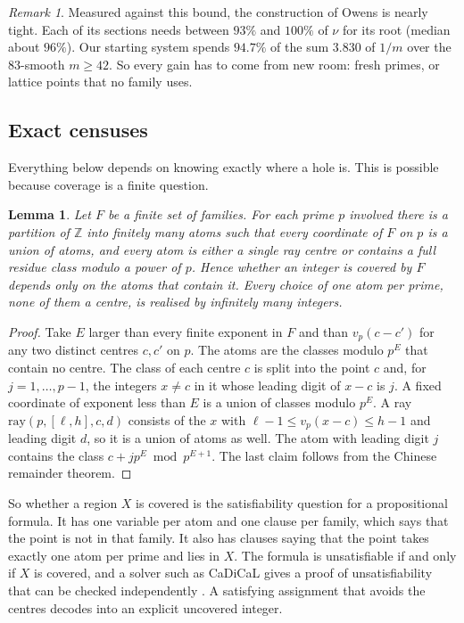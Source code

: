 \documentclass[11pt]{amsart}
\newtheorem{lemma}[theorem]{Lemma}
\theoremstyle{definition}
\theoremstyle{remark}
\newtheorem{remark}[theorem]{Remark}
\newcommand{\Z}{\mathbb{Z}}
\newcommand{\ray}{\mathrm{ray}}
\begin{document}
\begin{remark}\label{rem:tight}
Measured against this bound, the construction of Owens is nearly tight. Each of its sections needs between $93\%$
and $100\%$ of $\nu$ for its root (median about $96\%$). Our starting system spends $94.7\%$ of the sum $3.830$ of
$1/m$ over the $83$-smooth $m\ge42$. So every gain has to come from new room: fresh primes, or lattice points that no
family uses.
\end{remark}

\subsection{Exact censuses}\label{sec:census}

Everything below depends on knowing exactly where a hole is. This is possible because coverage is a finite question.

\begin{lemma}\label{lem:atoms}
Let $F$ be a finite set of families. For each prime $p$ involved there is a partition of $\Z$ into finitely many
\emph{atoms} such that every coordinate of $F$ on $p$ is a union of atoms, and every atom is either a single ray
centre or contains a full residue class modulo a power of $p$. Hence whether an integer is covered by $F$ depends
only on the atoms that contain it. Every choice of one atom per prime, none of them a centre, is realised by
infinitely many integers.
\end{lemma}

\begin{proof}
Take $E$ larger than every finite exponent in $F$ and than $v_p(c-c')$ for any two distinct centres $c,c'$ on $p$.
The atoms are the classes modulo $p^E$ that contain no centre. The class of each centre $c$ is split into the point
$c$ and, for $j=1,\dots,p-1$, the integers $x\ne c$ in it whose leading digit of $x-c$ is $j$. A fixed coordinate
of exponent less than $E$ is a union of classes modulo $p^E$. A ray $\ray(p,[\ell,h],c,d)$ consists of the $x$
with $\ell-1\le v_p(x-c)\le h-1$ and leading digit $d$, so it is a union of atoms as well. The atom with leading digit
$j$ contains the class $c+jp^E \bmod p^{E+1}$. The last claim follows from the Chinese remainder theorem.
\end{proof}

So whether a region $X$ is covered is the satisfiability question for a propositional formula. It has one variable
per atom and one clause per family, which says that the point is not in that family. It also has clauses saying that
the point takes exactly one atom per prime and lies in $X$. The formula is unsatisfiable if and only if $X$ is
covered, and a solver such as CaDiCaL \cite{CaDiCaL} gives a proof of unsatisfiability that can be checked
independently \cite{DRATtrim}. A satisfying assignment that avoids the centres decodes into an explicit uncovered
integer.
\end{document}
